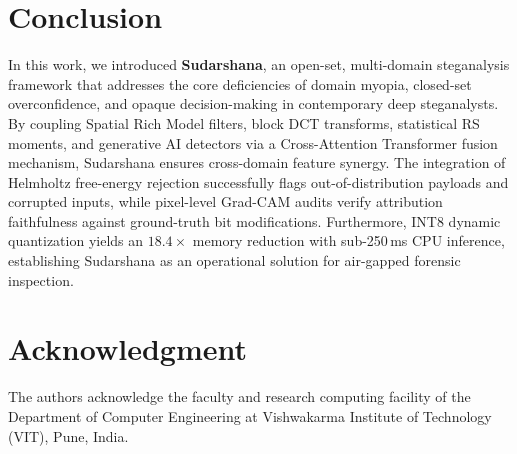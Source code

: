 \documentclass[journal]{IEEEtran}
\begin{document}
\section{Conclusion}
In this work, we introduced \textbf{Sudarshana}, an open-set, multi-domain steganalysis framework that addresses the core deficiencies of domain myopia, closed-set overconfidence, and opaque decision-making in contemporary deep steganalysts. By coupling Spatial Rich Model filters, block DCT transforms, statistical RS moments, and generative AI detectors via a Cross-Attention Transformer fusion mechanism, Sudarshana ensures cross-domain feature synergy. The integration of Helmholtz free-energy rejection successfully flags out-of-distribution payloads and corrupted inputs, while pixel-level Grad-CAM audits verify attribution faithfulness against ground-truth bit modifications. Furthermore, INT8 dynamic quantization yields an $18.4\times$ memory reduction with sub-250\,ms CPU inference, establishing Sudarshana as an operational solution for air-gapped forensic inspection.

\section*{Acknowledgment}
The authors acknowledge the faculty and research computing facility of the Department of Computer Engineering at Vishwakarma Institute of Technology (VIT), Pune, India.



\end{document}
